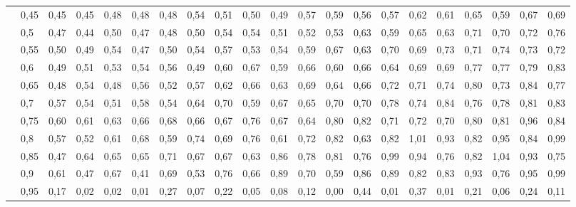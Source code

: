 \documentclass[a4paper,12pt]{article}
\theoremstyle{plain}
\begin{document}
\begin{landscape}
\begin{table}[H]
{\begin{tabular}{rl||ccccccccccccccccccc}
          & 0,45  & 0,45  & 0,45  & 0,48  & 0,48  & 0,48  & 0,54  & 0,51  & 0,50  & 0,49  & 0,57  & 0,59  & 0,56  & 0,57  & 0,62  & 0,61  & 0,65  & 0,59  & 0,67  & 0,69 \\
          & 0,5   & 0,47  & 0,44  & 0,50  & 0,47  & 0,48  & 0,50  & 0,54  & 0,54  & 0,51  & 0,52  & 0,53  & 0,63  & 0,59  & 0,65  & 0,63  & 0,71  & 0,70  & 0,72  & 0,76 \\
          & 0,55  & 0,50  & 0,49  & 0,54  & 0,47  & 0,50  & 0,54  & 0,57  & 0,53  & 0,54  & 0,59  & 0,67  & 0,63  & 0,70  & 0,69  & 0,73  & 0,71  & 0,74  & 0,73  & 0,72 \\
          & 0,6   & 0,49  & 0,51  & 0,53  & 0,54  & 0,56  & 0,49  & 0,60  & 0,67  & 0,59  & 0,66  & 0,60  & 0,66  & 0,64  & 0,69  & 0,69  & 0,77  & 0,77  & 0,79  & 0,83 \\
          & 0,65  & 0,48  & 0,54  & 0,48  & 0,56  & 0,52  & 0,57  & 0,62  & 0,66  & 0,63  & 0,69  & 0,64  & 0,66  & 0,72  & 0,71  & 0,74  & 0,80  & 0,73  & 0,84  & 0,77 \\
          & 0,7   & 0,57  & 0,54  & 0,51  & 0,58  & 0,54  & 0,64  & 0,70  & 0,59  & 0,67  & 0,65  & 0,70  & 0,70  & 0,78  & 0,74  & 0,84  & 0,76  & 0,78  & 0,81  & 0,83 \\
          & 0,75  & 0,60  & 0,61  & 0,63  & 0,66  & 0,68  & 0,66  & 0,67  & 0,76  & 0,67  & 0,64  & 0,80  & 0,82  & 0,71  & 0,72  & 0,70  & 0,80  & 0,81  & 0,96  & 0,84 \\
          & 0,8   & 0,57  & 0,52  & 0,61  & 0,68  & 0,59  & 0,74  & 0,69  & 0,76  & 0,61  & 0,72  & 0,82  & 0,63  & 0,82  & 1,01  & 0,93  & 0,82  & 0,95  & 0,84  & 0,99 \\
          & 0,85  & 0,47  & 0,64  & 0,65  & 0,65  & 0,71  & 0,67  & 0,67  & 0,63  & 0,86  & 0,78  & 0,81  & 0,76  & 0,99  & 0,94  & 0,76  & 0,82  & 1,04  & 0,93  & 0,75 \\
          & 0,9   & 0,61  & 0,47  & 0,67  & 0,41  & 0,69  & 0,53  & 0,76  & 0,66  & 0,89  & 0,70  & 0,59  & 0,86  & 0,89  & 0,82  & 0,83  & 0,93  & 0,76  & 0,95  & 0,99 \\
          & 0,95  & 0,17  & 0,02  & 0,02  & 0,01  & 0,27  & 0,07  & 0,22  & 0,05  & 0,08  & 0,12  & 0,00  & 0,44  & 0,01  & 0,37  & 0,01  & 0,21  & 0,06  & 0,24  & 0,11 \\
    \end{tabular}%
  \label{tab:addlabel}%
  }
\end{table}%
\end{landscape}
\end{document}
